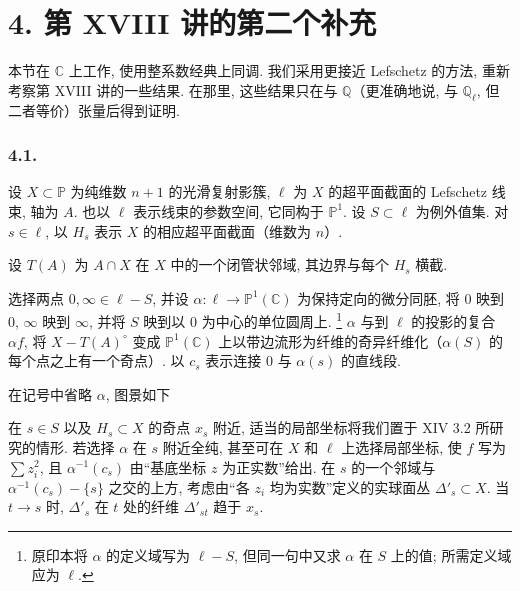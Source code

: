 \section*{4. 第 XVIII 讲的第二个补充}

本节在 $\mathbb C$ 上工作, 使用整系数经典上同调. 我们采用更接近 Lefschetz 的方法, 重新考察第 XVIII 讲的一些结果. 在那里, 这些结果只在与 $\mathbb Q$（更准确地说, 与 $\mathbb Q_\ell$, 但二者等价）张量后得到证明.

\subsubsection*{4.1.}
设 $X\subset\mathbb P$ 为纯维数 $n+1$ 的光滑复射影簇, $\ell$ 为 $X$ 的超平面截面的 Lefschetz 线束, 轴为 $A$. 也以 $\ell$ 表示线束的参数空间, 它同构于 $\mathbb P^1$. 设 $S\subset\ell$ 为例外值集. 对 $s\in\ell$, 以 $H_s$ 表示 $X$ 的相应超平面截面（维数为 $n$）.

设 $T(A)$ 为 $A\cap X$ 在 $X$ 中的一个闭管状邻域, 其边界与每个 $H_s$ 横截.

选择两点 $0,\infty\in\ell-S$, 并设 $\alpha:\ell\to\mathbb P^1(\mathbb C)$ 为保持定向的微分同胚, 将 $0$ 映到 $0$, $\infty$ 映到 $\infty$, 并将 $S$ 映到以 $0$ 为中心的单位圆周上.
\footnote{原印本将 $\alpha$ 的定义域写为 $\ell-S$, 但同一句中又求 $\alpha$ 在 $S$ 上的值; 所需定义域应为 $\ell$.}
$\alpha$ 与到 $\ell$ 的投影的复合 $\alpha f$, 将 $X-T(A)^\circ$ 变成 $\mathbb P^1(\mathbb C)$ 上以带边流形为纤维的奇异纤维化（$\alpha(S)$ 的每个点之上有一个奇点）. 以 $c_s$ 表示连接 $0$ 与 $\alpha(s)$ 的直线段.

在记号中省略 $\alpha$, 图景如下
\begin{center}
\end{center}

在 $s\in S$ 以及 $H_s\subset X$ 的奇点 $x_s$ 附近, 适当的局部坐标将我们置于 XIV 3.2 所研究的情形. 若选择 $\alpha$ 在 $s$ 附近全纯, 甚至可在 $X$ 和 $\ell$ 上选择局部坐标, 使 $f$ 写为 $\sum z_i^2$, 且 $\alpha^{-1}(c_s)$ 由“基底坐标 $z$ 为正实数”给出. 在 $s$ 的一个邻域与 $\alpha^{-1}(c_s)-\{s\}$ 之交的上方, 考虑由“各 $z_i$ 均为实数”定义的实球面丛 $\Delta'_s\subset X$. 当 $t\to s$ 时, $\Delta'_s$ 在 $t$ 处的纤维 $\Delta'_{st}$ 趋于 $x_s$.

